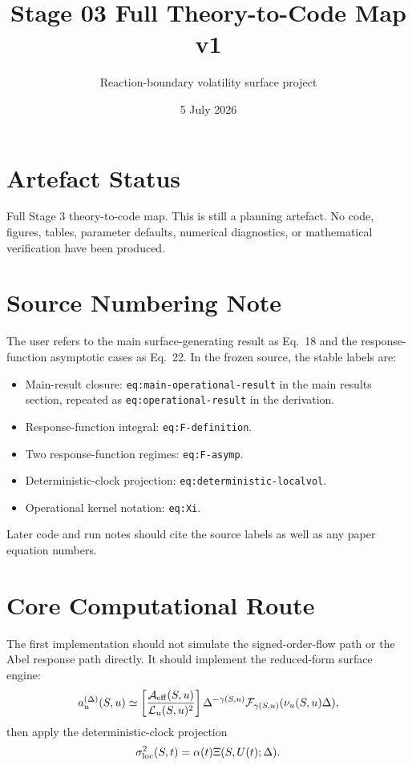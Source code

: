 \documentclass[11pt]{article}
\title{Stage 03 Full Theory-to-Code Map v1}
\author{Reaction-boundary volatility surface project}
\date{5 July 2026}
\begin{document}
\maketitle

\section*{Artefact Status}
Full Stage 3 theory-to-code map. This is still a planning artefact. No
code, figures, tables, parameter defaults, numerical diagnostics, or
mathematical verification have been produced.

\section*{Source Numbering Note}
The user refers to the main surface-generating result as Eq.~18 and the
response-function asymptotic cases as Eq.~22. In the frozen source, the
stable labels are:
\begin{itemize}
  \item Main-result closure: \texttt{eq:main-operational-result} in the
  main results section, repeated as \texttt{eq:operational-result} in the
  derivation.
  \item Response-function integral: \texttt{eq:F-definition}.
  \item Two response-function regimes: \texttt{eq:F-asymp}.
  \item Deterministic-clock projection: \texttt{eq:deterministic-localvol}.
  \item Operational kernel notation: \texttt{eq:Xi}.
\end{itemize}
Later code and run notes should cite the source labels as well as any
paper equation numbers.

\section*{Core Computational Route}
The first implementation should not simulate the signed-order-flow path or
the Abel response path directly. It should implement the reduced-form
surface engine:
\[
 a_u^{(\Delta)}(S,u)
 \simeq
 \left[\frac{\mathcal A_{\rm eff}(S,u)}{\mathcal L_u(S,u)^2}\right]
 \Delta^{-\gamma(S,u)}
 \mathcal F_{\gamma(S,u)}(\nu_u(S,u)\Delta),
\]
then apply the deterministic-clock projection
\[
 \sigma_{\rm loc}^2(S,t)=\alpha(t)\Xi(S,U(t);\Delta).
\]
\end{document}
